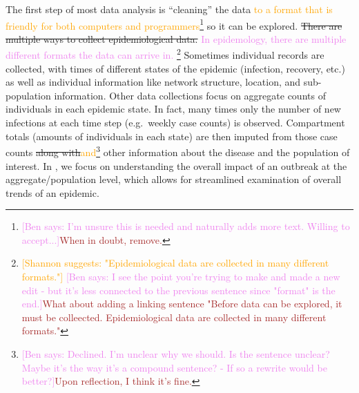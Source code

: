 \documentclass[
  shortnames]{jss}
\begin{document}
The first step of most data analysis is ``cleaning'' the data
\textcolor{orange}{to a format that is friendly for both computers and programmers}\footnote{\textcolor{violet}{[Ben says: I'm unsure this is needed and naturally adds more text. Willing to accept...]}\textcolor{brown}{When in doubt, remove.}}
so it can be explored.
\sout{There are multiple ways to collect epidemiological data.}
\textcolor{violet}{In epidemology, there are multiple different formats the data can arrive in.}
\footnote{\textcolor{orange}{[Shannon suggests: "Epidemiological data are collected in many different formats."]} \textcolor{violet}{[Ben says: I see the point you're trying to make and made a new edit - but it's less connected to the previous sentence since "format" is the end.]}\textcolor{brown}{What about adding a linking sentence "Before data can be explored, it must be colleected.  Epidemiological data are collected in many different formats."}}
Sometimes individual records are collected, with times of different
states of the epidemic (infection, recovery, etc.) as well as individual
information like network structure, location, and sub-population
information. Other data collections focus on aggregate counts of
individuals in each epidemic state. In fact, many times only the number
of new infections at each time step (e.g.~weekly case counts) is
observed. Compartment totals (amounts of individuals in each state) are
then imputed from those case
counts\sout{ along with}\textcolor{orange}{and}\footnote{\textcolor{violet}{[Ben says: Declined. I'm unclear why we should. Is the sentence unclear? Maybe it's the way it's a compound sentence? - If so a rewrite would be better?]}\textcolor{brown}{Upon reflection, I think it's fine.}}
other information about the disease and the population of interest. In
, we focus on understanding the overall impact of an
outbreak at the aggregate/population level, which allows for streamlined
examination of overall trends of an epidemic.
\end{document}
